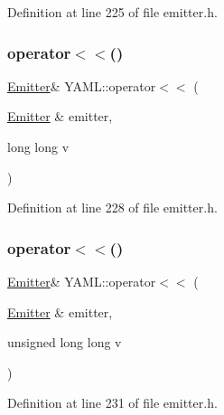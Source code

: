 Definition at line 225 of file emitter.\+h.

\mbox{\label{namespace_y_a_m_l_a978907c257b4ab1d882d6d6b920f4389}} 
\subsubsection{\texorpdfstring{operator$<$$<$()}{operator<<()}\hspace{0.1cm}{\footnotesize\ttfamily [29/35]}}
{\footnotesize\ttfamily \mbox{\hyperlink{class_y_a_m_l_1_1_emitter}{Emitter}}\& Y\+A\+M\+L\+::operator$<$$<$ (\begin{DoxyParamCaption}\item[{\mbox{\hyperlink{class_y_a_m_l_1_1_emitter}{Emitter}} \&}]{emitter,  }\item[{long long}]{v }\end{DoxyParamCaption})\hspace{0.3cm}{\ttfamily [inline]}}



Definition at line 228 of file emitter.\+h.

\mbox{\label{namespace_y_a_m_l_a3e9d3b0d71926ec315268554be89062a}} 
\subsubsection{\texorpdfstring{operator$<$$<$()}{operator<<()}\hspace{0.1cm}{\footnotesize\ttfamily [30/35]}}
{\footnotesize\ttfamily \mbox{\hyperlink{class_y_a_m_l_1_1_emitter}{Emitter}}\& Y\+A\+M\+L\+::operator$<$$<$ (\begin{DoxyParamCaption}\item[{\mbox{\hyperlink{class_y_a_m_l_1_1_emitter}{Emitter}} \&}]{emitter,  }\item[{unsigned long long}]{v }\end{DoxyParamCaption})\hspace{0.3cm}{\ttfamily [inline]}}



Definition at line 231 of file emitter.\+h.

\mbox{\label{namespace_y_a_m_l_ac08f8bce087727d2391bf58cefba2efb}} 
